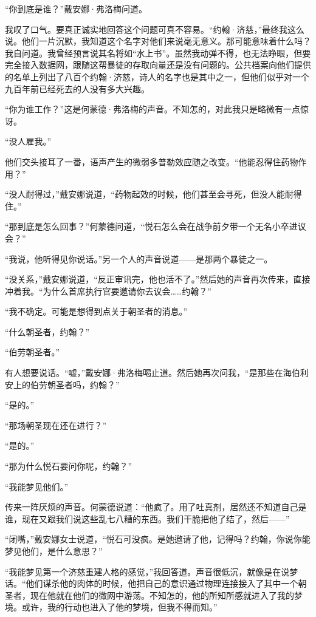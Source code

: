 \documentclass[AutoFakeBold=true]{book}
\begin{document}
``{\kaishu 你到底}是谁？''戴安娜·弗洛梅问道。

我叹了口气。要真正诚实地回答这个问题可真不容易。``约翰·济慈，''最终我这么说。他们一片沉默，我知道这个名字对他们来说毫无意义。{\kaishu 那可能意味着什么吗？}我自问道。我曾经预言说其名将如``水上书''。虽然我动弹不得，也无法睁眼，但要完全接入数据网，跟随这帮暴徒的存取向量还是没有问题的。公共档案向他们提供的名单上列出了八百个约翰·济慈，诗人的名字也是其中之一，但他们似乎对一个九百年前已经死去的人没有多大兴趣。

``你为谁工作？''这是何蒙德·弗洛梅的声音。不知怎的，对此我只是略微有一点惊讶。

``没人雇我。''

他们交头接耳了一番，语声产生的微弱多普勒效应随之改变。``他能忍得住药物作用？''

``没人{\kaishu 耐得过}，''戴安娜说道，``药物起效的时候，他们甚至会寻死，但没人能耐得住。''

``那到底是怎么回事？''何蒙德问道，``悦石怎么会在战争前夕带一个无名小卒进议会？''

``我说，他听得见你说话。''另一个人的声音说道——是那两个暴徒之一。

``没关系，''戴安娜说道，``反正审讯完，他也活不了。''然后她的声音再次传来，直接冲着我。``为什么首席执行官要邀请你去议会……约翰？''

``我不确定。可能是想得到点关于朝圣者的消息。''

``什么朝圣者，约翰？''

``伯劳朝圣者。''

有人想要说话。``嘘，''戴安娜·弗洛梅喝止道。然后她再次问我，``是那些在海伯利安上的伯劳朝圣者吗，约翰？''

``是的。''

``那场朝圣现在还在进行？''

``是的。''

``那为什么悦石要问你呢，约翰？''

``我能梦见他们。''

传来一阵厌烦的声音。何蒙德说道：``他疯了。用了吐真剂，居然还不知道自己是谁，现在又跟我们说这些乱七八糟的东西。我们干脆把他了结了，然后——''

``闭嘴，''戴安娜女士说道，``悦石可没疯。是她邀请了他，记得吗？约翰，你说你能梦见他们，是什么意思？''

``我能梦见第一个济慈重建人格的感觉，''我回答道。声音很低沉，就像是在说梦话。``他们谋杀他的肉体的时候，他把自己的意识通过物理连接接入了其中一个朝圣者，现在他就在他们的微网中游荡。不知怎的，他的所知所感就进入了我的梦境。或许，我的行动也进入了他的梦境，但我不得而知。''
\end{document}
